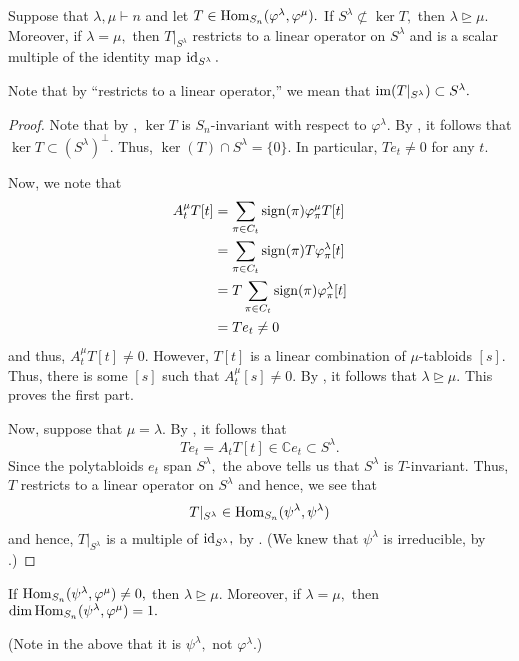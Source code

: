 \begin{lem} \label{lem:morphismkerdom}
	Suppose that $\lambda, \mu \vdash n$ and let $T \in \operatorname{Hom}_{S_n}(\varphi^\lambda, \varphi^\mu).$ If $S^\lambda \not\subset \ker T,$ then $\lambda \unrhd \mu.$ \\
	Moreover, if $\lambda = \mu,$ then $T|_{S^\lambda}$ restricts to a linear operator on $S^\lambda$ and is a scalar multiple of the identity map $\operatorname{id}_{S^\lambda}.$
\end{lem}
Note that by ``restricts to a linear operator,'' we mean that $\operatorname{im}(T|_{S^\lambda}) \subset S^\lambda.$
\begin{proof} 
	Note that by , $\ker T$ is $S_n$-invariant with respect to $\varphi^\lambda.$ By , it follows that $\ker T \subset (S^\lambda)^\perp.$ Thus, $\ker(T) \cap S^\lambda = \{0\}.$ In particular, $Te_t \neq 0$ for any $t.$

	Now, we note that
	\begin{align*} 
		A^\mu_tT[t] &= \sum_{\pi \in C_t}\operatorname{sign}(\pi)\varphi^\mu_\pi T[t]\\
		&= \sum_{\pi \in C_t}\operatorname{sign}(\pi)T\varphi^\lambda_\pi[t]\\
		&= T\sum_{\pi \in C_t}\operatorname{sign}(\pi)\varphi^\lambda_\pi[t]\\
		&= Te_t \neq 0
	\end{align*}
	and thus, $A^\mu_tT[t] \neq 0.$ However, $T[t]$ is a linear combination of $\mu$-tabloids $[s].$ Thus, there is some $[s]$ such that $A^\mu_t[s] \neq 0.$ By , it follows that $\lambda \unrhd \mu.$ This proves the first part.

	Now, suppose that $\mu = \lambda.$ By , it follows that
	\begin{equation*} 
		Te_t = A_tT[t] \in \mathbb{C}e_t \subset S^\lambda.
	\end{equation*}
	Since the polytabloids $e_t$ span $S^\lambda,$ the above tells us that $S^\lambda$ is $T$-invariant. Thus, $T$ restricts to a linear operator on $S^\lambda$ and hence, we see that
	\begin{equation*} 
		T|_{S^\lambda} \in \operatorname{Hom}_{S_n}(\psi^\lambda, \psi^\lambda)
	\end{equation*}
	and hence, $T|_{S^\lambda}$ is a multiple of $\operatorname{id}_{S^\lambda},$ by . (We knew that $\psi^\lambda$ is irreducible, by .)
\end{proof}

\begin{lem} 
	If $\operatorname{Hom}_{S_n}(\psi^\lambda, \varphi^\mu) \neq 0,$ then $\lambda \unrhd \mu.$ Moreover, if $\lambda = \mu,$ then $\dim \operatorname{Hom}_{S_n}(\psi^\lambda, \varphi^\mu) = 1.$
\end{lem}
(Note in the above that it is $\psi^\lambda,$ not $\varphi^\lambda.$)


